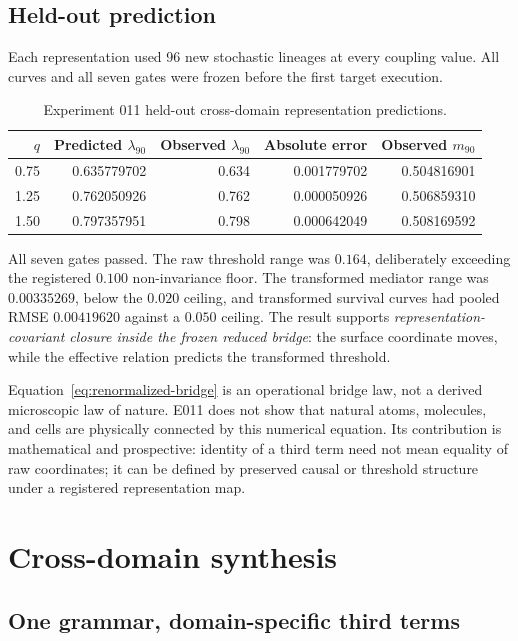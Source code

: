 \documentclass[11pt,a4paper]{article}
\begin{document}
\subsection{Held-out prediction}

Each representation used 96 new stochastic lineages at every coupling value. All curves and all seven gates were frozen before the first target execution.

\begin{table}[H]
\centering
\footnotesize
\caption{Experiment 011 held-out cross-domain representation predictions.}
\begin{tabular}{@{}rrrrr@{}}
\toprule
$q$ & Predicted $\lambda_{90}$ & Observed $\lambda_{90}$ & Absolute error & Observed $m_{90}$ \\
\midrule
0.75 & 0.635779702 & 0.634 & 0.001779702 & 0.504816901 \\
1.25 & 0.762050926 & 0.762 & 0.000050926 & 0.506859310 \\
1.50 & 0.797357951 & 0.798 & 0.000642049 & 0.508169592 \\
\bottomrule
\end{tabular}
\end{table}

All seven gates passed. The raw threshold range was $0.164$, deliberately exceeding the registered $0.100$ non-invariance floor. The transformed mediator range was $0.00335269$, below the $0.020$ ceiling, and transformed survival curves had pooled RMSE $0.00419620$ against a $0.050$ ceiling. The result supports \emph{representation-covariant closure inside the frozen reduced bridge}: the surface coordinate moves, while the effective relation predicts the transformed threshold.

Equation~\eqref{eq:renormalized-bridge} is an operational bridge law, not a derived microscopic law of nature. E011 does not show that natural atoms, molecules, and cells are physically connected by this numerical equation. Its contribution is mathematical and prospective: identity of a third term need not mean equality of raw coordinates; it can be defined by preserved causal or threshold structure under a registered representation map.

\section{Cross-domain synthesis}

\subsection{One grammar, domain-specific third terms}
\end{document}
